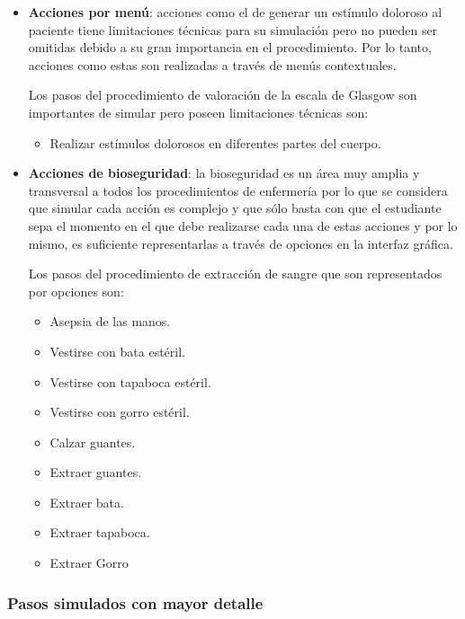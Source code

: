 \begin{itemize}
\item 
    \textbf{Acciones por menú}: acciones como el de generar un estímulo doloroso 
    al paciente tiene limitaciones técnicas para su simulación pero no pueden ser 
    omitidas debido a su gran importancia en el procedimiento. Por lo tanto, 
    acciones como estas son realizadas a través de menús contextuales.
    
    Los pasos del procedimiento de valoración de la escala de Glasgow son importantes 
    de simular pero poseen limitaciones técnicas son:
    \begin{itemize}
        \item Realizar estímulos dolorosos en diferentes partes del cuerpo.
    \end{itemize}
    
    

\item 
    \textbf{Acciones de bioseguridad}: la bioseguridad es un área muy amplia y 
    transversal a todos los procedimientos de enfermería por lo que se considera 
    que simular cada acción es complejo y que sólo basta con que el estudiante sepa 
    el momento en el que debe realizarse cada una de estas acciones y por lo mismo,
    es suficiente representarlas a través de opciones en la interfaz gráfica.
    
    Los pasos del procedimiento de extracción de sangre que son representados por 
    opciones son:
    \begin{itemize}
        \item Asepsia de las manos.
        \item Vestirse con bata estéril.
        \item Vestirse con tapaboca estéril.
        \item Vestirse con gorro estéril.
        \item Calzar guantes.
        \item Extraer guantes.
        \item Extraer bata.
        \item Extraer tapaboca.
        \item Extraer Gorro
    \end{itemize}
    

\end{itemize}

\subsubsection{Pasos simulados con mayor detalle}

